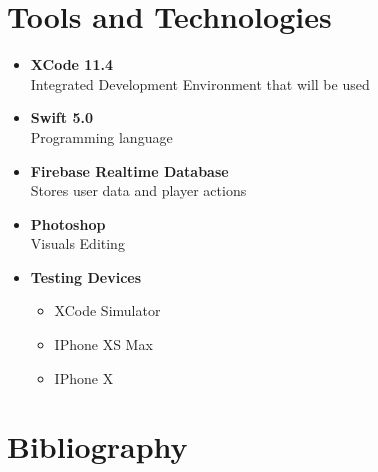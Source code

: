 \documentclass{scrartcl}
\begin{document}
\section{Tools and Technologies}
    \begin{itemize}
        \item \textbf{XCode 11.4}\\Integrated Development Environment that will be used
        \item \textbf{Swift 5.0}\\Programming language
        \item \textbf{Firebase Realtime Database}\\Stores user data and player actions
        \item \textbf{Photoshop}\\Visuals Editing
        
        \item \textbf{Testing Devices}
            \begin{itemize}
            \item XCode Simulator
            \item IPhone XS Max
            \item IPhone X
            \end{itemize}
    \end{itemize}


\section{Bibliography}
\end{document}
